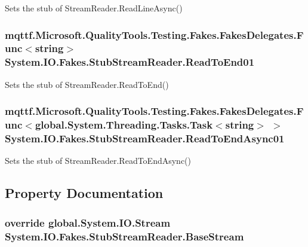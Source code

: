 Sets the stub of Stream\-Reader.\-Read\-Line\-Async()

\hypertarget{class_system_1_1_i_o_1_1_fakes_1_1_stub_stream_reader_aaea3a193e6d626255ecf1d45bcc593ed}{
\subsubsection[{Read\-To\-End01}]{\setlength{\rightskip}{0pt plus 5cm}mqttf.\-Microsoft.\-Quality\-Tools.\-Testing.\-Fakes.\-Fakes\-Delegates.\-Func$<$string$>$ System.\-I\-O.\-Fakes.\-Stub\-Stream\-Reader.\-Read\-To\-End01}}\label{class_system_1_1_i_o_1_1_fakes_1_1_stub_stream_reader_aaea3a193e6d626255ecf1d45bcc593ed}


Sets the stub of Stream\-Reader.\-Read\-To\-End()

\hypertarget{class_system_1_1_i_o_1_1_fakes_1_1_stub_stream_reader_a0ac1a9e7b354daefa317243ca063721a}{
\subsubsection[{Read\-To\-End\-Async01}]{\setlength{\rightskip}{0pt plus 5cm}mqttf.\-Microsoft.\-Quality\-Tools.\-Testing.\-Fakes.\-Fakes\-Delegates.\-Func$<$global.\-System.\-Threading.\-Tasks.\-Task$<$string$>$ $>$ System.\-I\-O.\-Fakes.\-Stub\-Stream\-Reader.\-Read\-To\-End\-Async01}}\label{class_system_1_1_i_o_1_1_fakes_1_1_stub_stream_reader_a0ac1a9e7b354daefa317243ca063721a}


Sets the stub of Stream\-Reader.\-Read\-To\-End\-Async()



\subsection{Property Documentation}
\hypertarget{class_system_1_1_i_o_1_1_fakes_1_1_stub_stream_reader_a2b535801a76af91d7b97d5ec332b5dfa}{
\subsubsection[{Base\-Stream}]{\setlength{\rightskip}{0pt plus 5cm}override global.\-System.\-I\-O.\-Stream System.\-I\-O.\-Fakes.\-Stub\-Stream\-Reader.\-Base\-Stream\hspace{0.3cm}{\ttfamily [get]}}}\label{class_system_1_1_i_o_1_1_fakes_1_1_stub_stream_reader_a2b535801a76af91d7b97d5ec332b5dfa}


